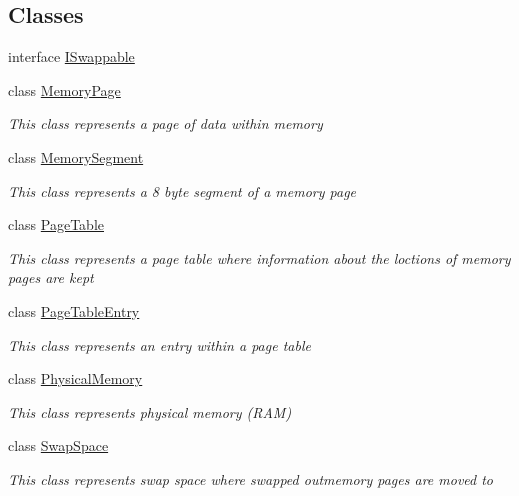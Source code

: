 \subsection*{Classes}
\begin{DoxyCompactItemize}
\item 
interface \hyperlink{interface_c_p_u___o_s___simulator_1_1_memory_1_1_i_swappable}{I\+Swappable}
\item 
class \hyperlink{class_c_p_u___o_s___simulator_1_1_memory_1_1_memory_page}{Memory\+Page}
\begin{DoxyCompactList}\small\item\em This class represents a page of data within memory \end{DoxyCompactList}\item 
class \hyperlink{class_c_p_u___o_s___simulator_1_1_memory_1_1_memory_segment}{Memory\+Segment}
\begin{DoxyCompactList}\small\item\em This class represents a 8 byte segment of a memory page \end{DoxyCompactList}\item 
class \hyperlink{class_c_p_u___o_s___simulator_1_1_memory_1_1_page_table}{Page\+Table}
\begin{DoxyCompactList}\small\item\em This class represents a page table where information about the loctions of memory pages are kept \end{DoxyCompactList}\item 
class \hyperlink{class_c_p_u___o_s___simulator_1_1_memory_1_1_page_table_entry}{Page\+Table\+Entry}
\begin{DoxyCompactList}\small\item\em This class represents an entry within a page table \end{DoxyCompactList}\item 
class \hyperlink{class_c_p_u___o_s___simulator_1_1_memory_1_1_physical_memory}{Physical\+Memory}
\begin{DoxyCompactList}\small\item\em This class represents physical memory (R\+A\+M) \end{DoxyCompactList}\item 
class \hyperlink{class_c_p_u___o_s___simulator_1_1_memory_1_1_swap_space}{Swap\+Space}
\begin{DoxyCompactList}\small\item\em This class represents swap space where swapped outmemory pages are moved to \end{DoxyCompactList}\end{DoxyCompactItemize}
